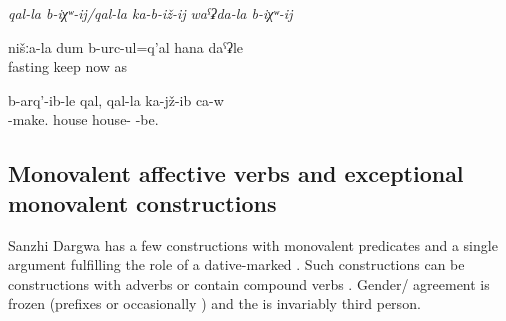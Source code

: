 \begin{exe}
	\ex	\label{ex:intransitiveverbsCompoundVerbs}
	\begin{xlist}
		\ex	{} 
		\ex	{} 
		\ex	{} 
		\ex \textit{qal-la b-iχʷ-ij\slash qal-la ka-b-iž-ij}  
		\ex \textit{waˁʡda-la b-iχʷ-ij} 
	\end{xlist}
	
		\ex	\label{ex:Our (people) were fasting like nowadays1}
	\gll	nišːa-la	dum	b-urc-ul=q'al	hana	daˁʡle\\
			fasting	keep	now	as\\
	\glt	{}
	
			\ex \label{ex:He built a house and married.}
		\gll b-arq'-ib-le qal, qal-la ka-jž-ib ca-w\\
		-make. house house- -be. \\
		\glt {}
		
	\end{exe}


\subsection{Monovalent affective verbs and exceptional monovalent constructions}\label{sec:Monovalent affective verbs and exceptional monovalent constructions}
\largerpage

Sanzhi Dargwa has a few constructions with monovalent predicates and a single argument fulfilling the role of a dative-marked  . Such constructions can be  constructions with adverbs  or contain compound verbs . Gender/ agreement is frozen (prefixes  or occasionally ) and the  is invariably third person.


